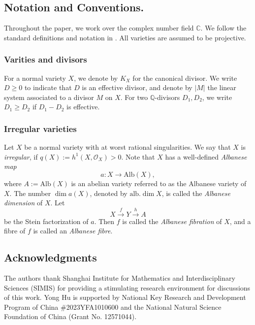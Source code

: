 \documentclass[11pt]{amsart}
\theoremstyle{plain}
\theoremstyle{definition}
\numberwithin{equation}{section}
\newcommand{\alb}{\mathrm{alb}}
\newcommand{\CC}{\mathbb{C}}
\begin{document}
\subsection{ Notation and Conventions.}

Throughout the paper, we work over the complex number field $\CC$. We follow the standard definitions and notation in \cite{KM98}.
All varieties are assumed to be projective. 

\subsubsection*{Varities and divisors}
For a normal variety $X$, we denote by $K_X$ for the canonical divisor.  We write $D\ge 0$ to indicate that $D$ is an effective divisor, and denote by $|M|$ the linear system associated to a divisor $M$ on $X$.
For two $\mathbb{Q}$-divisors $D_1, D_2$, we write $D_1 \ge D_2$ if $D_1-D_2$ is effective. 
\subsubsection*{Irregular varieties} Let $X$ be a normal variety with at worst rational singularities. We say that $X$ is \emph{irregular}, if $q(X) := h^1(X, \mathcal{O}_X) > 0$. Note that $X$ has a well-defined \emph{Albanese map}
$$
a: X \to \mathrm{Alb}(X),
$$
where $A:=\mathrm{Alb}(X)$ is an abelian variety referred to as the Albanese variety of $X$. The number $\dim a(X)$, denoted by $\alb.\dim X$, is called the \emph{Albanese dimension} of $X$. Let 
$$
X \stackrel{f}\rightarrow Y \stackrel{h}\rightarrow A
$$ 
be the Stein factorization of $a$. Then $f$ is called the \emph{Albanese fibration} of $X$, and a fibre of $f$ is called an \emph{Albanese fibre}.




 

\subsection*{Acknowledgments}
The authors thank  Shanghai Institute for Mathematics and Interdisciplinary Sciences (SIMIS) for providing a stimulating research environment for discussions of this work. 
Yong Hu is supported by National Key Research and Development Program of China \#2023YFA1010600 and the National Natural Science Foundation of China (Grant No. 12571044).
\end{document}
